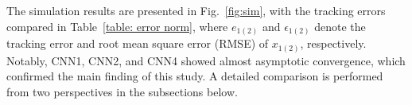 \documentclass[letterpaper, 10 pt, conference]{ieeeconf}  %
\begin{document}
The simulation results are presented in Fig.~\ref{fig:sim}, with the tracking errors compared in Table~\ref{table: error norm}, where $e_{1(2)}$ and $\epsilon_{1(2)}$ denote the tracking error and root mean square error (RMSE) of $x_{1(2)}$, respectively. Notably, CNN1, CNN2, and CNN4 showed almost asymptotic convergence, which confirmed the main finding of this study. A detailed comparison is performed from two perspectives in the subsections below.


\begin{figure}%
    \centering
    \hfill
    \vfill
    \hfill
    \vfill
\end{figure}
\end{document}
